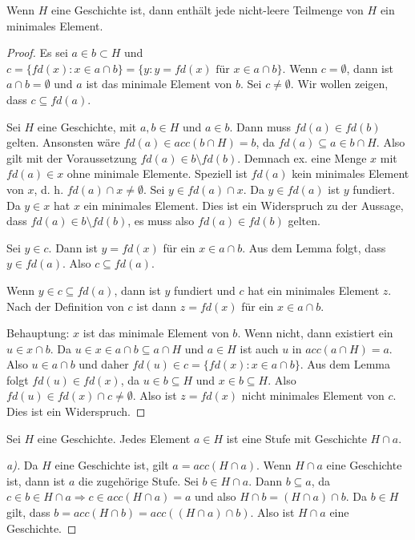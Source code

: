 \begin{satz}
	Wenn $H$ eine Geschichte ist, dann enthält jede nicht-leere Teilmenge von $H$ ein minimales Element.
\end{satz}
\begin{proof}
	Es sei $a\in b \subset H$ und $c=\{fd(x) : x \in a\cap b\}=\{y:y=fd(x)\text{ für } x\in a \cap b\}$.
	Wenn $c=\emptyset$, dann ist $a\cap b = \emptyset$ und $a$ ist das minimale Element von $b$.
	Sei $c\neq \emptyset$. Wir wollen zeigen, dass $c\subseteq fd(a)$.
	
	\begin{lemma}
		Sei $H$ eine Geschichte, mit $a,b\in H$ und $a\in b$. Dann muss $fd(a)\in fd(b)$ gelten. Ansonsten wäre $fd(a)\in acc(b\cap H)=b$, da $fd(a)\subseteq a \in b \cap H$. Also gilt mit der Voraussetzung $fd(a)\in b \setminus fd(b)$. Demnach ex. eine Menge $x$ mit $fd(a)\in x$ ohne minimale Elemente. Speziell ist $fd(a)$ kein minimales Element von $x$, d. h. $fd(a)\cap x \neq \emptyset$. Sei $y\in fd(a)\cap x$. Da $y\in fd(a)$ ist $y$ fundiert. Da $y \in x$ hat $x$ ein minimales Element. Dies ist ein Widerspruch zu der Aussage, dass $fd(a)\in b \setminus fd(b)$, es muss also $fd(a)\in fd(b)$ gelten.
	\end{lemma}

	Sei $y\in c$. Dann ist $y = fd(x)$ für ein $x\in a\cap b$. Aus dem Lemma folgt, dass $y\in fd(a)$. Also $c\subseteq fd(a)$.
	
	Wenn $y\in c \subseteq fd(a)$, dann ist $y$ fundiert und $c$ hat ein minimales Element $z$. Nach der Definition von $c$ ist dann $z=fd(x)$ für ein $x\in a\cap b$.
	
	Behauptung: $x$ ist das minimale Element von $b$. Wenn nicht, dann existiert ein $u \in x \cap b$. Da $u \in x \in a\cap b\subseteq a\cap H$ und $a\in H$ ist auch $u$ in $acc(a\cap H)=a$. Also $u \in a\cap b$ und daher $fd(u)\in c = \{fd(x):x\in a\cap b\}$. Aus dem Lemma folgt $fd(u)\in fd(x)$, da $u\in b \subseteq H$ und $x\in b \subseteq H$. Also $fd(u)\in fd(x)\cap c \neq \emptyset$. Also ist $z=fd(x)$ nicht minimales Element von $c$. Dies ist ein Widerspruch.
\end{proof}

\begin{satz}
	Sei $H$ eine Geschichte. Jedes Element $a\in H$ ist eine Stufe mit Geschichte $H\cap a$.
	\label{ElementVonGeschichteIstStufe}
\end{satz}
\begin{proof}[a)]
	Da $H$ eine Geschichte ist, gilt $a=acc(H\cap a)$. Wenn $H\cap a$ eine Geschichte ist, dann ist $a$ die zugehörige Stufe. Sei $b\in H \cap a$. Dann $b\subseteq a$, da $c\in b \in H\cap a \Rightarrow c \in acc(H\cap a)=a$ und also $H\cap b = (H\cap a)\cap b$. Da $b\in H$ gilt, dass $b=acc(H\cap b) = acc((H\cap a)\cap b)$. Also ist $H\cap a$ eine Geschichte.
\end{proof}

